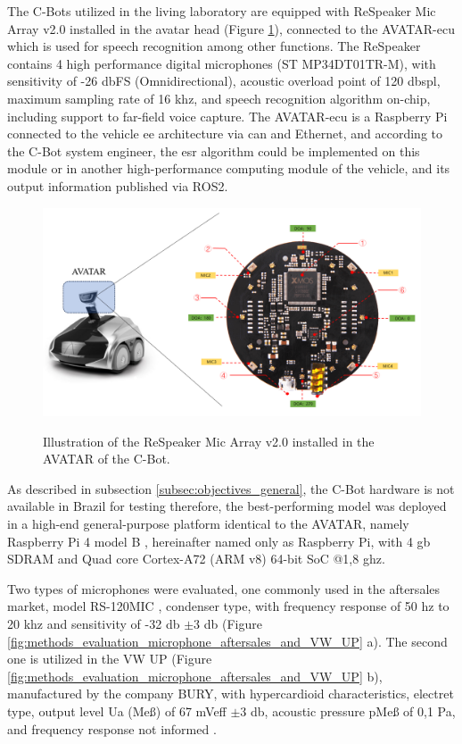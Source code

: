 The C-Bots utilized in the living laboratory are equipped with ReSpeaker Mic Array v2.0 \cite{ReSpeake72} installed in the avatar head (Figure \ref{fig:methods_evaluation_AVATAR_ReSpeaker}), connected to the AVATAR-\gls{ecu} which is used for speech recognition among other functions. The ReSpeaker contains 4 high performance digital microphones (ST MP34DT01TR-M), with sensitivity of -26 \gls{db}FS (Omnidirectional), acoustic overload point of 120 \gls{db}\gls{spl}, maximum sampling rate of 16 \gls{k}\gls{hz}, and speech recognition algorithm on-chip, including support to far-field voice capture. The AVATAR-\gls{ecu} is a Raspberry Pi connected to the vehicle \gls{ee} architecture via \gls{can} and Ethernet, and according to the C-Bot system engineer, the \gls{esr} algorithm could be implemented on this module or in another high-performance computing module of the vehicle, and its output information published via ROS2. 

\begin{figure}[htbp]
    \raggedright
        \caption{Illustration of the ReSpeaker Mic Array v2.0 installed in the AVATAR of the C-Bot.}
        \includegraphics[width=.7\textwidth]{resources/images/050-methods/Methods_evaluation_microphone_ReSpeaker_Mic_Array_v2.0.png}
        \label{fig:methods_evaluation_AVATAR_ReSpeaker}
\end{figure}

As described in subsection \ref{subsec:objectives_general}, the C-Bot hardware is not available in Brazil for testing therefore, the best-performing model was deployed in a high-end general-purpose platform identical to the AVATAR, namely Raspberry Pi 4 model B \cite{Raspberry2023}, hereinafter named only as Raspberry Pi, with 4 \gls{g}\gls{b} SDRAM and Quad core Cortex-A72 (ARM v8) 64-bit SoC @1,8 \gls{g}\gls{hz}. 

Two types of microphones were evaluated, one commonly used in the aftersales market, model RS-120MIC \cite{Roadstar2021}, condenser type, with frequency response of 50 \gls{hz} to 20 \gls{k}\gls{hz} and sensitivity of -32 \gls{db} $\pm$3 \gls{db} (Figure \ref{fig:methods_evaluation_microphone_aftersales_and_VW_UP} a). The second one is utilized in the VW UP (Figure \ref{fig:methods_evaluation_microphone_aftersales_and_VW_UP} b), manufactured by the company BURY, with hypercardioid characteristics, electret type, output level Ua (Meß) of 67 mVeff $\pm$3 \gls{db}, acoustic pressure pMeß of 0,1 Pa, and frequency response not informed \cite{BURY2024}.

